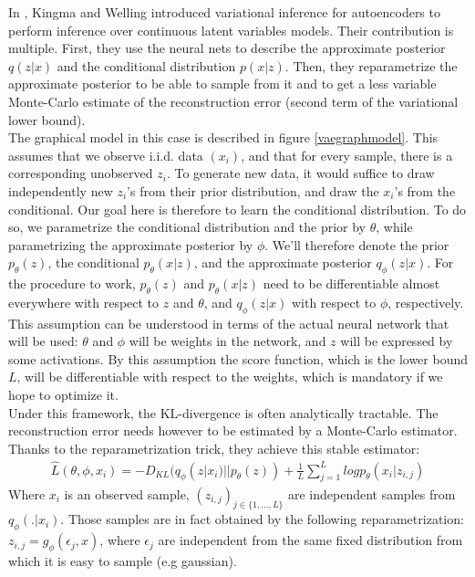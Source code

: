 \documentclass[letterpaper, twoside]{article}
\begin{document}
    In \cite{Kingma.aevb}, Kingma and Welling introduced variational inference for autoencoders to perform inference over continuous latent variables models. Their contribution is multiple. First, they use the neural nets to describe the approximate posterior $q(z|x)$ and the conditional distribution $p(x|z)$. Then, they reparametrize the approximate posterior to be able to sample from it and to get a less variable Monte-Carlo estimate of the reconstruction error (second term of the variational lower bound).\\

    The graphical model in this case is described in figure \ref{vaegraphmodel}. This assumes that we observe i.i.d. data $(x_i)$, and that for every sample, there is a corresponding unobserved $z_i$. To generate new data, it would suffice to draw independently new $z_i$'s from their prior distribution, and draw the $x_i$'s from the conditional. Our goal here is therefore to learn the conditional distribution. To do so, we parametrize the conditional distribution and the prior by $\theta$, while parametrizing the approximate posterior by $\phi$. We'll therefore denote the prior $p_\theta(z)$, the conditional $p_\theta(x|z)$, and the approximate posterior $q_\phi(z|x)$. For the procedure to work, $p_\theta(z)$ and $p_\theta(x|z)$ need to be differentiable almost everywhere with respect to $z$ and $\theta$, and $q_\phi(z|x)$ with respect to $\phi$, respectively. This assumption can be understood in terms of the actual neural network that will be used: $\theta$ and $\phi$ will be weights in the network, and $z$ will be expressed by some activations. By this assumption the score function, which is the lower bound $L$, will be differentiable with respect to the weights, which is mandatory if we hope to optimize it.\\

    Under this framework, the KL-divergence is often analytically tractable. The reconstruction error needs however to be estimated by a Monte-Carlo estimator. Thanks to the reparametrization trick, they achieve this stable estimator:\\
    \begin{align}
    \hat L(\theta, \phi, x_i) = -D_{KL}(q_\phi(z|x_i)||p_\theta(z)) + \frac{1}{L} \sum_{j=1}^L log p_\theta(x_i | z_{i, j})
    \end{align}
    Where $x_i$ is an observed sample, $(z_{i, j})_{j\in \{1, ..., L\}}$ are independent samples from $q_\phi(.|x_i)$. Those samples are in fact obtained by the following reparametrization: $z_{i, j}= g_\phi(\epsilon_j, x)$, where $\epsilon_j$ are independent from the same fixed distribution from which it is easy to sample (e.g gaussian).
\end{document}
